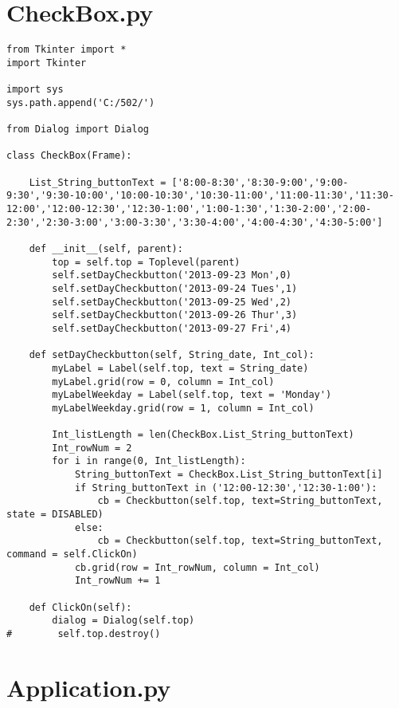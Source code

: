 \documentclass[12pt]{book}
\begin{document}
\section{CheckBox.py}
\label{sec-37-4}
\lstset{language=Python,label= ,caption= ,numbers=none}
\begin{lstlisting}
from Tkinter import *
import Tkinter

import sys
sys.path.append('C:/502/')

from Dialog import Dialog

class CheckBox(Frame):

    List_String_buttonText = ['8:00-8:30','8:30-9:00','9:00-9:30','9:30-10:00','10:00-10:30','10:30-11:00','11:00-11:30','11:30-12:00','12:00-12:30','12:30-1:00','1:00-1:30','1:30-2:00','2:00-2:30','2:30-3:00','3:00-3:30','3:30-4:00','4:00-4:30','4:30-5:00']

    def __init__(self, parent):
        top = self.top = Toplevel(parent)
        self.setDayCheckbutton('2013-09-23 Mon',0)
        self.setDayCheckbutton('2013-09-24 Tues',1)
        self.setDayCheckbutton('2013-09-25 Wed',2)
        self.setDayCheckbutton('2013-09-26 Thur',3)
        self.setDayCheckbutton('2013-09-27 Fri',4)

    def setDayCheckbutton(self, String_date, Int_col):
        myLabel = Label(self.top, text = String_date)
        myLabel.grid(row = 0, column = Int_col)
        myLabelWeekday = Label(self.top, text = 'Monday')
        myLabelWeekday.grid(row = 1, column = Int_col)

        Int_listLength = len(CheckBox.List_String_buttonText)
        Int_rowNum = 2
        for i in range(0, Int_listLength):
            String_buttonText = CheckBox.List_String_buttonText[i]
            if String_buttonText in ('12:00-12:30','12:30-1:00'):
                cb = Checkbutton(self.top, text=String_buttonText, state = DISABLED)
            else:
                cb = Checkbutton(self.top, text=String_buttonText, command = self.ClickOn)
            cb.grid(row = Int_rowNum, column = Int_col)
            Int_rowNum += 1

    def ClickOn(self):
        dialog = Dialog(self.top)
#        self.top.destroy()
\end{lstlisting}

\section{Application.py}
\label{sec-37-5}
\end{document}
